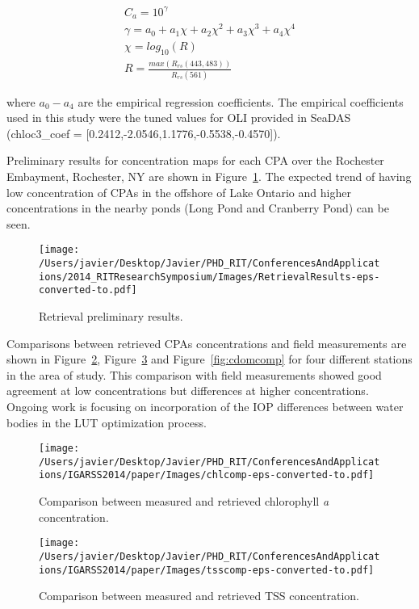 \begin{equation}
\begin{gathered}
  C_a = 10^{\gamma}\\
  \gamma = a_0+a_1\chi+a_2\chi^2+a_3\chi^3+a_4\chi^4\\
  \chi = log_{10}(R)\\
  R = \frac{max(R_{rs}(443,483))}{R_{rs}(561)}
\end{gathered}
\end{equation}

\noindent where $a_0-a_4$ are the empirical regression coefficients. The empirical coefficients used in this study were the tuned values for OLI provided in SeaDAS (chloc3\_coef = [0.2412,-2.0546,1.1776,-0.5538,-0.4570]).


 Preliminary results for concentration maps for each CPA over the Rochester Embayment, Rochester, NY are shown in Figure~\ref{fig:retrievalresults}. The expected trend of having low concentration of CPAs in the offshore of Lake Ontario and higher concentrations in the nearby ponds (Long Pond and Cranberry Pond) can be seen. 
\begin{figure}[htb]
\centering
\texttt{[image: /Users/javier/Desktop/Javier/PHD\_RIT/ConferencesAndApplications/2014\_RITResearchSymposium/Images/RetrievalResults-eps-converted-to.pdf]}
   \caption{Retrieval preliminary results.}
      \label{fig:retrievalresults}   
\end{figure}

Comparisons between retrieved CPAs concentrations and field measurements are shown in Figure~\ref{fig:chlcomp}, Figure~\ref{fig:tsscomp} and Figure~\ref{fig:cdomcomp} for four different stations in the area of study. This comparison with field measurements showed good agreement at low concentrations but differences at higher concentrations. Ongoing work is focusing on incorporation of the IOP differences between water bodies in the LUT optimization process.
\begin{figure}[htb]
\centering
    \texttt{[image: /Users/javier/Desktop/Javier/PHD\_RIT/ConferencesAndApplications/IGARSS2014/paper/Images/chlcomp-eps-converted-to.pdf]} 
    \caption{Comparison between measured and retrieved chlorophyll {\it a} concentration.}
    \label{fig:chlcomp} 
\end{figure}     

\begin{figure}[htb]
\centering
    \texttt{[image: /Users/javier/Desktop/Javier/PHD\_RIT/ConferencesAndApplications/IGARSS2014/paper/Images/tsscomp-eps-converted-to.pdf]}   
    \caption{Comparison between measured and retrieved TSS concentration.}
    \label{fig:tsscomp} 
\end{figure}  

